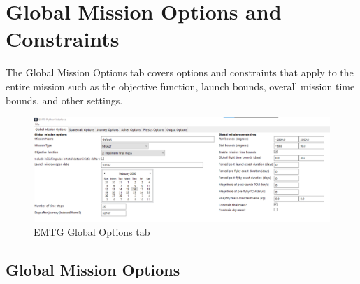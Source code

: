 
\section{Global Mission Options and Constraints}
\label{sec:global_options}
The Global Mission Options tab covers options and constraints that apply to the entire mission such as the objective function, launch bounds, overall mission time bounds, and other settings.


\begin{figure}[H]
    \centering
    \includegraphics[width=1.0\textwidth]{../../shared_latex_inputs/images/pyemtg_global_options_tab.png}
    \caption{EMTG Global Options tab}
\end{figure}

\subsection{Global Mission Options}

